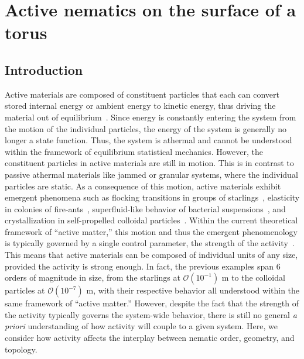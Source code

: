 \chapter{Active nematics on the surface of a torus}\label{c:3}
\section{Introduction}
Active materials are composed of constituent particles that each can convert stored internal energy or ambient energy to kinetic energy, thus driving the material out of equilibrium~\cite{RN237,RN238,RN40}.
Since energy is constantly entering the system from the motion of the individual particles, the energy of the system is generally no longer a state function.
Thus, the system is athermal and cannot be understood within the framework of equilibrium statistical mechanics.
However, the constituent particles in active materials are still in motion.
This is in contrast to passive athermal materials like jammed or granular systems, where the individual particles are static.
As a consequence of this motion, active materials exhibit emergent phenomena such as flocking transitions in groups of starlings~\cite{RN239,RN240}, elasticity in colonies of fire-ants~\cite{RN242}, superfluid-like behavior of bacterial suspensions~\cite{RN270,RN271}, and crystallization in self-propelled colloidal particles~\cite{RN168,RN38}.
Within the current theoretical framework of ``active matter,'' this motion and thus the emergent phenomenology is typically governed by a single control parameter, the strength of the activity~\cite{RN237,RN238,RN40}.
This means that active materials can be composed of individual units of any size, provided the activity is strong enough.
In fact, the previous examples span 6 orders of magnitude in size, from the starlings at $\mathcal{O}(10^{-1})$ m to the colloidal particles at $\mathcal{O}(10^{-7})$ m, with their respective behavior all understood within the same framework of ``active matter.''
However, despite the fact that the strength of the activity typically governs the system-wide behavior, there is still no general \emph{a priori} understanding of how activity will couple to a given system.
Here, we consider how activity affects the interplay between nematic order, geometry, and topology.
